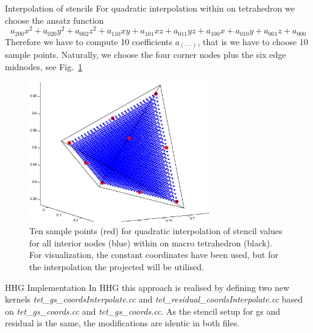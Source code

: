 \documentclass[a4paper,11pt,reqno]{amsart}
\numberwithin{figure}{section}
\numberwithin{table}{section}
\numberwithin{figure}{section}
\begin{document}

\begin{section}{Interpolation of stencils}
For quadratic interpolation within on tetrahedron we choose the ansatz function
\begin{equation}
\label{eq:quadraticPolynomial}
a_{200}x^2 + a_{020}y^2 + a_{002}z^2 + a_{110}xy + a_{101}xz + a_{011}yz + 
a_{100}x + a_{010}y + a_{001}z + a_{000}
\end{equation}
Therefore we have to compute 10 coefficients $a_{(\cdot\cdot\cdot)}$, that is we
have to choose 10 sample points. Naturally, we choose the four corner nodes plus the six
edge midnodes, see Fig.~\ref{fig:samplePoints}

\begin{figure}\centering
\includegraphics[width=0.7\textwidth]{pics/tetSamplePoints} 
\caption{Ten sample points (red) for quadratic interpolation of stencil values for 
all interior nodes (blue) within on macro tetrahedron (black). For visualization,
the constant coordinates have been used, but for the interpolation the projected
will be utilised.}
\label{fig:samplePoints}
\end{figure}  


\begin{subsection}{HHG Implementation}
In HHG this approach is realised by defining two new kernels 
\emph{tet\_gs\_coordsInterpolate.cc}
and \emph{tet\_residual\_coordsInterpolate.cc} based on \emph{tet\_gs\_coords.cc} and 
\emph{tet\_gs\_coords.cc}. As the stencil setup for gs and residual is the same, 
the modifications are identic in both files.


\end{subsection}
\end{section}
\end{document}
